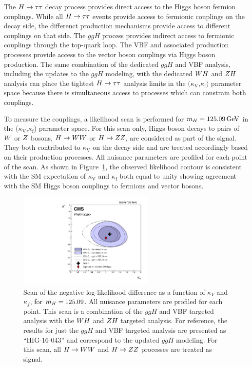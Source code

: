 The $H\to\tau\tau$ decay process
provides direct access to the Higgs boson fermion couplings. While all
$H\to\tau\tau$ events provide access to fermionic couplings on the decay side,
the differenct production mechanisms provide access to different couplings on that side.
The $ggH$ process provides indirect access to fermionic couplings through
the top-quark loop. The VBF and associated production processes provide access to the
vector boson couplings via Higgs boson production.
The same combination of the dedicated $ggH$ and VBF analysis, including
the updates to the $ggH$ modeling, with
the dedicated $WH$ and $ZH$ analysis can place the tightest
$H\to\tau\tau$ analysis limits in the $(\kappa_\text{V}$,$\kappa_\text{f})$ parameter space
because there is simultaneous access to processes which can constrain both
couplings.

To measure the couplings, a likelihood scan is performed for $m_{H}=125.09\,\mathrm{GeV}$ in 
the ($\kappa_\text{V}$,$\kappa_\text{f}$) parameter space.
For this scan only, Higgs boson decays to pairs of $W$ or $Z$ bosons, $H\to WW$ or $H\to ZZ$,
are considered as part of the signal. They both contributed to $\kappa_\text{V}$ on the
decay side and are treated accordingly based on their production processes.
All nuisance 
parameters are profiled for each point of the scan. As shown in 
Figure~\ref{fig:cmb_kFkV}, the observed likelihood contour is consistent with the SM expectation 
of $\kappa_\text{V}$ and $\kappa_\text{f}$ both equal to unity showing
agreement with the SM Higgs boson couplings to fermions and vector bosons.

\begin{figure}[!ht]
 \begin{center}
  \includegraphics[width=0.60\textwidth]{higgs_to_taus_vh/plots/combined/kFkV_HIG-18-007_plus_HIG-16-043_comp_up.pdf}
 \end{center}
 \caption{Scan of the negative 
 log-likelihood difference as a function of $\kappa_V$ and $\kappa_f$, for 
 $m_{H} = 125.09$\GeV.  All nuisance parameters are profiled for each point. 
 This scan is a combination of the $ggH$ and VBF targeted analysis with the 
 $WH$ and $ZH$ targeted analysis. For reference, the results for just
 the $ggH$ and VBF targeted analysis are presented as ``HIG-16-043'' and correspond
 to the updated $ggH$ modeling.
 For this scan, all $H\to WW$ and $H\to ZZ$ processes 
 are treated as signal.
 }
 \label{fig:cmb_kFkV}
\end{figure}



\clearpage
